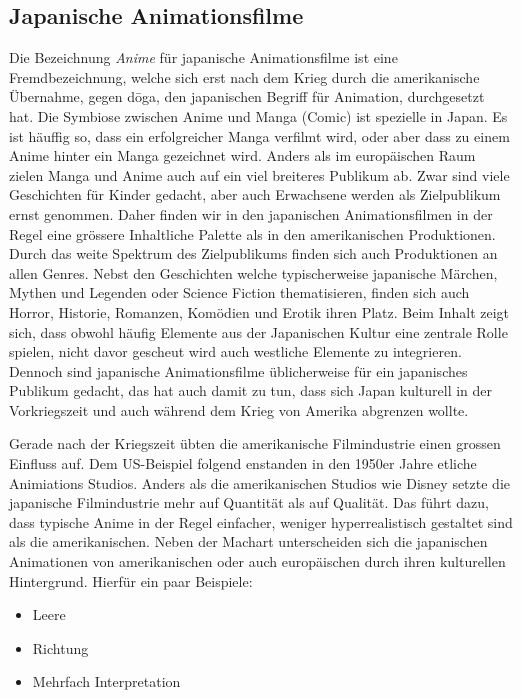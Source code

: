 \subsection{Japanische Animationsfilme}
Die Bezeichnung \emph{Anime} für japanische Animationsfilme ist eine Fremdbezeichnung, welche sich erst nach dem Krieg durch die amerikanische Übernahme, gegen d\={o}ga, den japanischen Begriff für Animation, durchgesetzt hat. Die Symbiose zwischen Anime und Manga (Comic) ist spezielle in Japan. Es ist häuffig so, dass ein erfolgreicher Manga verfilmt wird, oder aber dass zu einem Anime hinter ein Manga gezeichnet wird. Anders als im europäischen Raum zielen Manga und Anime auch auf ein viel breiteres Publikum ab. Zwar sind viele Geschichten für Kinder gedacht, aber auch Erwachsene werden als Zielpublikum ernst genommen. Daher finden wir in den japanischen Animationsfilmen in der Regel eine grössere Inhaltliche Palette als in den amerikanischen Produktionen. Durch das weite Spektrum des Zielpublikums finden sich auch Produktionen an allen Genres. Nebst den Geschichten welche typischerweise japanische Märchen, Mythen und Legenden oder Science Fiction thematisieren, finden sich auch Horror, Historie, Romanzen, Komödien und Erotik ihren Platz. Beim Inhalt zeigt sich, dass obwohl häufig Elemente aus der Japanischen Kultur eine zentrale Rolle spielen, nicht davor gescheut wird auch westliche Elemente zu integrieren. Dennoch sind japanische Animationsfilme üblicherweise für ein japanisches Publikum gedacht, das hat auch damit zu tun, dass sich Japan kulturell in der Vorkriegszeit und auch während dem Krieg von Amerika abgrenzen wollte. 

Gerade nach der Kriegszeit übten die amerikanische Filmindustrie einen grossen Einfluss auf. Dem US-Beispiel folgend enstanden in den 1950er Jahre etliche Animiations Studios. Anders als die amerikanischen Studios wie Disney setzte die japanische Filmindustrie mehr auf Quantität als auf Qualität. Das führt dazu, dass typische Anime in der Regel einfacher, weniger hyperrealistisch gestaltet sind als die amerikanischen. Neben der Machart unterscheiden sich die japanischen Animationen von amerikanischen oder auch europäischen durch ihren kulturellen Hintergrund. Hierfür ein paar Beispiele:

\begin{itemize}
	\item Leere
	\item Richtung
	\item Mehrfach Interpretation
\end{itemize}


